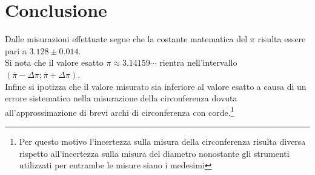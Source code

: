 \section*{Conclusione}

Dalle misurazioni effettuate segue che la costante matematica del $\pi$ risulta essere pari a $3.128 \pm 0.014$.\\
Si nota che il valore esatto $\pi \approx 3.14159\cdots$ rientra nell'intervallo $(\overline{\pi}-\Delta \pi ; \overline{\pi}+\Delta \pi)$.\\
Infine si ipotizza che il valore misurato sia inferiore al valore esatto a causa di un errore sistematico nella misurazione della circonferenza
 dovuta all'approssimazione di brevi archi di circonferenza con corde.\footnote{Per questo motivo l'incertezza sulla misura della circonferenza risulta diversa rispetto all'incertezza sulla misura del diametro nonostante gli strumenti utilizzati per entrambe le misure siano i medesimi}\\
